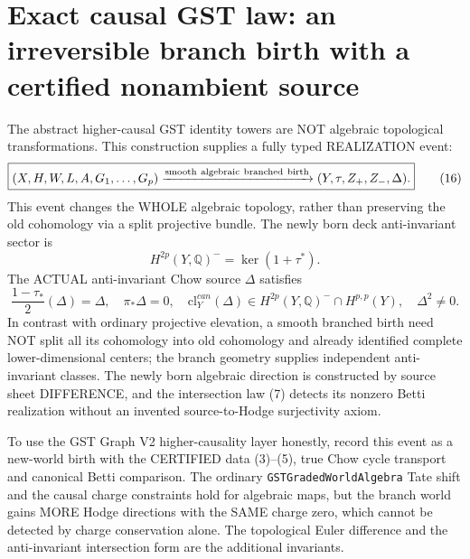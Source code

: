 \documentclass[11pt]{article}
\newcommand{\Q}{\mathbb Q}
\newcommand{\cl}{\mathrm{cl}}
\begin{document}
\section{Exact causal GST law: an irreversible branch birth with a certified nonambient source}
The abstract higher-causal GST identity towers
are NOT algebraic topological transformations.
This construction supplies a fully typed
REALIZATION event:
\[
 \boxed{
 (X,H,W,L,A,G_1,\dots,G_p)
 \xrightarrow{\rm smooth\ algebraic\ branched\ birth}
 (Y,\tau,Z_+,Z_-,\Delta).
 }                                                        \tag{16}
\]
This event changes the WHOLE algebraic topology,
rather than preserving the old cohomology via
a split projective bundle.
The newly born deck anti-invariant sector is
\[
 H^{2p}(Y,\Q)^{-}
   =\ker(1+\tau^*).
\]
The ACTUAL anti-invariant Chow source \(\Delta\)
satisfies
\[
 \boxed{
 \frac{1-\tau_*}{2}(\Delta)=\Delta,\quad
 \pi_*\Delta=0,\quad
 \cl_Y^{can}(\Delta)\in
       H^{2p}(Y,\Q)^-\cap H^{p,p}(Y),
 \quad\Delta^2\ne0.
 }                                                        \tag{17}
\]
In contrast with ordinary projective elevation,
a smooth branched birth need NOT split all its
cohomology into old cohomology and already
identified complete lower-dimensional centers;
the branch geometry supplies independent
anti-invariant classes.
The newly born algebraic direction is
constructed by source sheet DIFFERENCE, and
the intersection law (7) detects its nonzero
Betti realization without an invented
source-to-Hodge surjectivity axiom.

To use the GST Graph V2 higher-causality layer
honestly, record this event as a new-world
birth with the CERTIFIED data (3)--(5),
true Chow cycle transport and canonical
Betti comparison. The ordinary
\texttt{GSTGradedWorldAlgebra}
Tate shift and the causal charge constraints
hold for algebraic maps, but the branch
world gains MORE Hodge directions with
the SAME charge zero, which cannot be
detected by charge conservation alone.
The topological Euler difference and the
anti-invariant intersection form are the
additional invariants.
\end{document}

